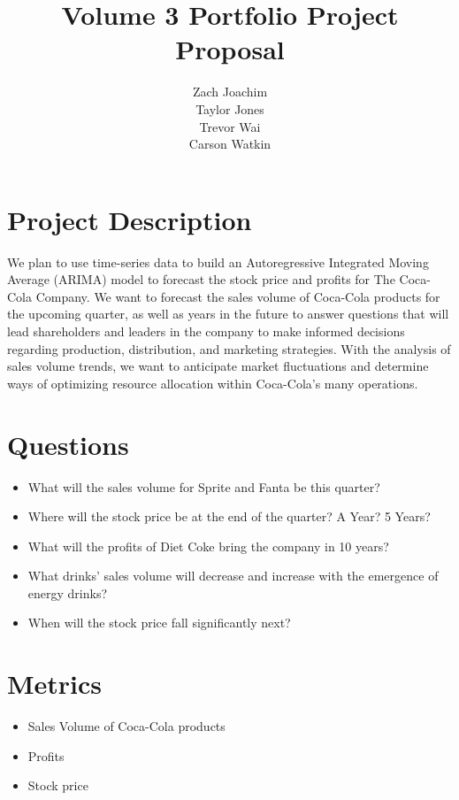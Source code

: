 \documentclass[12pt]{article}
\title{Volume 3 Portfolio Project Proposal}
\author{Zach Joachim\\Taylor Jones\\Trevor Wai\\Carson Watkin}
\begin{document}
\maketitle

\section{Project Description}

We plan to use time-series data to build an Autoregressive Integrated Moving Average (ARIMA) model to forecast 
the stock price and profits for The Coca-Cola Company. We want to forecast the sales volume of Coca-Cola products 
for the upcoming quarter, as well as years in the future to answer questions that will lead shareholders and 
leaders in the company to make informed decisions regarding production, distribution, and marketing strategies. 
With the analysis of sales volume trends, we want to anticipate market fluctuations and determine ways of 
optimizing resource allocation within Coca-Cola's many operations.

\section{Questions}

\begin{itemize}
    \item What will the sales volume for Sprite and Fanta be this quarter?
    \item Where will the stock price be at the end of the quarter? A Year? 5 Years?
    \item What will the profits of Diet Coke bring the company in 10 years?
    \item What drinks' sales volume will decrease and increase with the emergence of energy drinks?
    \item When will the stock price fall significantly next?
\end{itemize}

\section{Metrics}

\begin{itemize}
    \item Sales Volume of Coca-Cola products
    \item Profits
    \item Stock price
\end{itemize}
\end{document}
